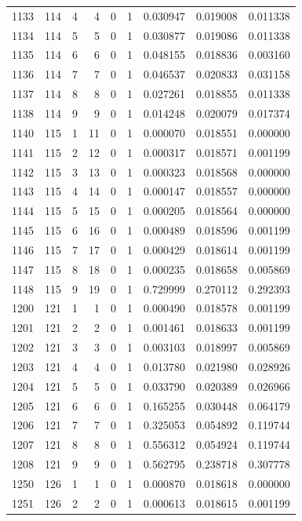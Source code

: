 \begin{longtable}{rrrrrrrrr}
1133 & 114 & 4 & 4 & 0 & 1 & 0.030947 & 0.019008 & 0.011338 \\
1134 & 114 & 5 & 5 & 0 & 1 & 0.030877 & 0.019086 & 0.011338 \\
1135 & 114 & 6 & 6 & 0 & 1 & 0.048155 & 0.018836 & 0.003160 \\
1136 & 114 & 7 & 7 & 0 & 1 & 0.046537 & 0.020833 & 0.031158 \\
1137 & 114 & 8 & 8 & 0 & 1 & 0.027261 & 0.018855 & 0.011338 \\
1138 & 114 & 9 & 9 & 0 & 1 & 0.014248 & 0.020079 & 0.017374 \\
1140 & 115 & 1 & 11 & 0 & 1 & 0.000070 & 0.018551 & 0.000000 \\
1141 & 115 & 2 & 12 & 0 & 1 & 0.000317 & 0.018571 & 0.001199 \\
1142 & 115 & 3 & 13 & 0 & 1 & 0.000323 & 0.018568 & 0.000000 \\
1143 & 115 & 4 & 14 & 0 & 1 & 0.000147 & 0.018557 & 0.000000 \\
1144 & 115 & 5 & 15 & 0 & 1 & 0.000205 & 0.018564 & 0.000000 \\
1145 & 115 & 6 & 16 & 0 & 1 & 0.000489 & 0.018596 & 0.001199 \\
1146 & 115 & 7 & 17 & 0 & 1 & 0.000429 & 0.018614 & 0.001199 \\
1147 & 115 & 8 & 18 & 0 & 1 & 0.000235 & 0.018658 & 0.005869 \\
1148 & 115 & 9 & 19 & 0 & 1 & 0.729999 & 0.270112 & 0.292393 \\
1200 & 121 & 1 & 1 & 0 & 1 & 0.000490 & 0.018578 & 0.001199 \\
1201 & 121 & 2 & 2 & 0 & 1 & 0.001461 & 0.018633 & 0.001199 \\
1202 & 121 & 3 & 3 & 0 & 1 & 0.003103 & 0.018997 & 0.005869 \\
1203 & 121 & 4 & 4 & 0 & 1 & 0.013780 & 0.021980 & 0.028926 \\
1204 & 121 & 5 & 5 & 0 & 1 & 0.033790 & 0.020389 & 0.026966 \\
1205 & 121 & 6 & 6 & 0 & 1 & 0.165255 & 0.030448 & 0.064179 \\
1206 & 121 & 7 & 7 & 0 & 1 & 0.325053 & 0.054892 & 0.119744 \\
1207 & 121 & 8 & 8 & 0 & 1 & 0.556312 & 0.054924 & 0.119744 \\
1208 & 121 & 9 & 9 & 0 & 1 & 0.562795 & 0.238718 & 0.307778 \\
1250 & 126 & 1 & 1 & 0 & 1 & 0.000870 & 0.018618 & 0.000000 \\
1251 & 126 & 2 & 2 & 0 & 1 & 0.000613 & 0.018615 & 0.001199 \\

\end{longtable}
